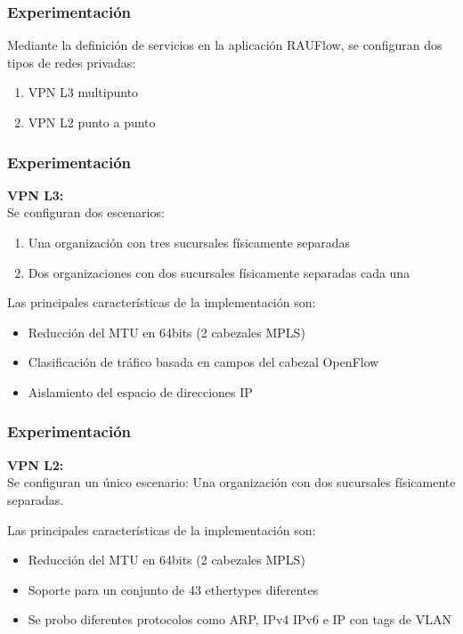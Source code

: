 \documentclass{beamer}
\begin{document}
\begin{frame}
\frametitle{Experimentaci\'on} 

Mediante la definici\'on de servicios en la aplicaci\'on RAUFlow, se configuran dos tipos de redes privadas:
\begin{enumerate}
\item VPN L3 multipunto
\item VPN L2 punto a punto 
\end{enumerate}


\end{frame}

\begin{frame}
\frametitle{Experimentaci\'on} 

\textbf{VPN L3:}\\

Se configuran dos escenarios:

\begin{enumerate}
\item Una organizaci\'on con tres sucursales f\'isicamente separadas
\item Dos organizaciones con dos sucursales f\'isicamente separadas cada una
\end{enumerate}

\vspace{0.4cm}

Las principales características de la implementaci\'on son:
\begin{itemize}
\item Reducci\'on del MTU en 64bits (2 cabezales MPLS)
\item Clasificaci\'on de tr\'afico basada en campos del cabezal OpenFlow
\item Aislamiento del espacio de direcciones IP
\end{itemize}


\end{frame}

\begin{frame}
\frametitle{Experimentaci\'on} 

\textbf{VPN L2:}\\

Se configuran un \'unico escenario: Una organizaci\'on con dos sucursales f\'isicamente separadas.

Las principales características de la implementaci\'on son:
\begin{itemize}
\item Reducci\'on del MTU en 64bits (2 cabezales MPLS)
\item Soporte para un conjunto de 43 ethertypes diferentes
\item Se probo diferentes protocolos como ARP, IPv4 IPv6 e IP con tags de VLAN
\end{itemize}


\end{frame}
\end{document}
